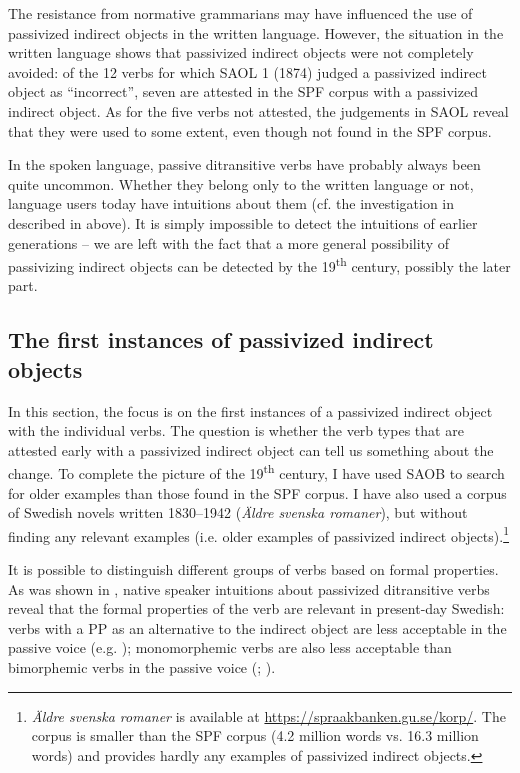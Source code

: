 \documentclass[output=paper]{langscibook}
\begin{document}
The resistance from normative grammarians may have influenced the use of passivized indirect objects in the written language. However, the situation in the written language shows that passivized indirect objects were not completely avoided: of the 12 verbs for which SAOL 1 (1874) judged a passivized indirect object as “incorrect”, seven are attested in the SPF corpus with a passivized indirect object. As for the five verbs not attested, the judgements in SAOL reveal that they were used to some extent, even though not found in the SPF corpus.



In the spoken language, passive ditransitive verbs have probably always been quite uncommon. Whether they belong only to the written language or not, language users today have intuitions about them (cf. the investigation in \citealt{HaddicanHolmberg2019} described in  above). It is simply impossible to detect the intuitions of earlier generations – we are left with the fact that a more general possibility of passivizing indirect objects can be detected by the 19\textsuperscript{th} century, possibly the later part.


\subsection{The first instances of passivized indirect objects}\label{sec:falk:3.7}


In this section, the focus is on the first instances of a passivized indirect object with the individual verbs. The question is whether the verb types that are attested early with a passivized indirect object can tell us something about the change. To complete the picture of the 19\textsuperscript{th} century, I have used SAOB to search for older examples than those found in the SPF corpus. I have also used a corpus of Swedish novels written 1830–1942 (\textit{Äldre svenska romaner}), but without finding any relevant examples (i.e. older examples of passivized indirect objects).\footnote{\textit{Äldre svenska romaner} is available at \url{https://spraakbanken.gu.se/korp/}. The corpus is smaller than the SPF corpus (4.2 million words vs. 16.3 million words) and provides hardly any examples of passivized indirect objects.}


It is possible to distinguish different groups of verbs based on formal properties. As was shown in , native speaker intuitions about passivized ditransitive verbs reveal that the formal properties of the verb are relevant in present-day Swedish: verbs with a PP as an alternative to the indirect object are less acceptable in the passive voice (e.g. \citealt{Anward1989}); monomorphemic verbs are also less acceptable than bimorphemic verbs in the passive voice (\citealt{HolmbergPlatzack1995}; \citealt{HaddicanHolmberg2019}).
\end{document}
